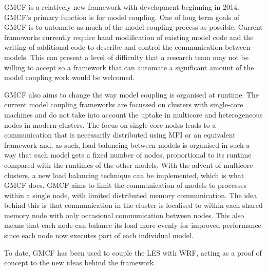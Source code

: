 GMCF is a relatively new framework with development beginning in 2014. GMCF's
primary function is for model coupling. One of long term goals of GMCF is to
automate as much of the model coupling process as possible. Current frameworks
currently require hand modification of existing model code and the writing of
additional code to describe and control the communication between models. This
can present a level of difficulty that a research team may not be willing to
accept so a framework that can automate a significant amount of the model
coupling work would be welcomed.

GMCF also aims to change the way model coupling is organised at runtime. The
current model coupling frameworks are focussed on clusters with single-core
machines and do not take into account the uptake in multicore and heterogeneous
nodes in modern clusters. The focus on single core nodes leads to a
communication that is necessarily distributed using MPI or an equivalent
framework and, as such, load balancing between models is organised in such a way
that each model gets a fixed number of nodes, proportional to its runtime
compared with the runtimes of the other models. With the advent of multicore
clusters, a new load balancing technique can be implemented, which is what GMCF
does. GMCF aims to limit the communication of models to processes within a
single node, with limited distributed memory communication. The idea behind this
is that communication in the cluster is localised to within each shared memory
node with only occasional communication between nodes. This also means that each
node can balance its load more evenly for improved performance since each node
now executes part of each individual model.

To date, GMCF has been used to couple the LES with WRF, acting as a proof of
concept to the new ideas behind the framework.
